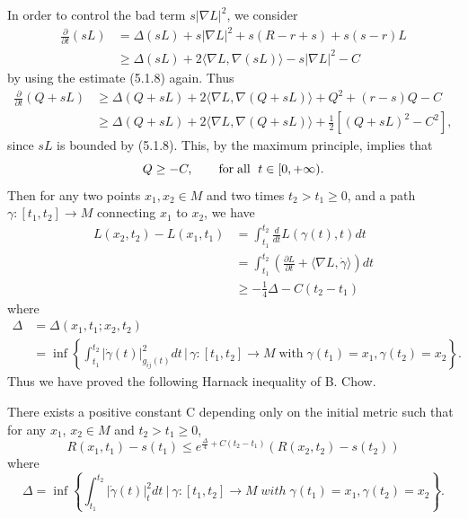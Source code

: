 In order to control the bad term $s|\nabla L|^2$, we consider
\begin{align*}
\frac{\partial }{\partial t}(sL)
&  =\Delta(sL)+s|\nabla L|^2+s(R-r+s)+s(s-r)L\\
&  \ge \Delta(sL)+2\langle\nabla L,\nabla(sL)\rangle -s|\nabla
L|^2-C
\end{align*}
by using the estimate (5.1.8) again. Thus
\begin{align*}
\frac{\partial }{\partial t}(Q+sL) &
\ge\Delta(Q+sL)+2\langle\nabla
L,\nabla(Q+sL)\rangle+Q^2+(r-s)Q-C\\
&  \ge \Delta(Q+sL)+2\langle\nabla L,\nabla(Q+sL)\rangle
+\frac{1}{2}[(Q+sL)^2-C^2],
\end{align*}
since $sL$ is bounded by (5.1.8). This, by the maximum principle,
implies that
$$
Q\ge -C,\qquad \text{for\;all }\;t\in[0,+\infty).
$$
Then for any two points $x_1,x_2\in M$ and two times $t_2>t_1\ge
0$, and a path $\gamma:[t_1,t_2]\rightarrow M$ connecting $x_1$ to
$x_2$, we have
\begin{align*}
L(x_2,t_2)-L(x_1,t_1)
&  = \int_{t_1}^{t_2}\frac{d}{dt}L(\gamma(t),t)dt\\
&  = \int_{t_1}^{t_2}\left(\frac{\partial L}{\partial t}+\langle\nabla
L,\dot{\gamma}\rangle\right)dt\\
&  \ge -\frac{1}{4}\Delta-C(t_2-t_1)
\end{align*}
where
\begin{align*}
\Delta&  = \Delta(x_1,t_1;x_2,t_2)\\
&  =
\inf\left\{\int_{t_1}^{t_2}|\dot{\gamma}(t)|^2_{g_{ij}(t)}dt\, |\,
\gamma:[t_1,t_2]\rightarrow
M\;\text{with}\;\gamma(t_1)=x_1,\gamma(t_2)=x_2\right\}.
\end{align*}
Thus we have proved the following Harnack inequality of B. Chow.

\begin{lemma}
  \label{lem:cz-positive-euler-surface-harnack}

There exists a positive constant C depending only on the initial
metric such that for any $x_1$, $x_2\in M$ and $t_2>t_1\ge 0$,
$$
R(x_1,t_1)-s(t_1) \le
e^{\frac{\Delta}{4}+C(t_2-t_1)}(R(x_2,t_2)-s(t_2))
$$
where
$$
\Delta=\inf\left\{\int_{t_1}^{t_2}|\dot{\gamma}(t)|^2_tdt\ |\
\gamma:[t_1,t_2]\rightarrow M\;with
\;\gamma(t_1)=x_1,\gamma(t_2)=x_2\right\}.
$$
\end{lemma}

